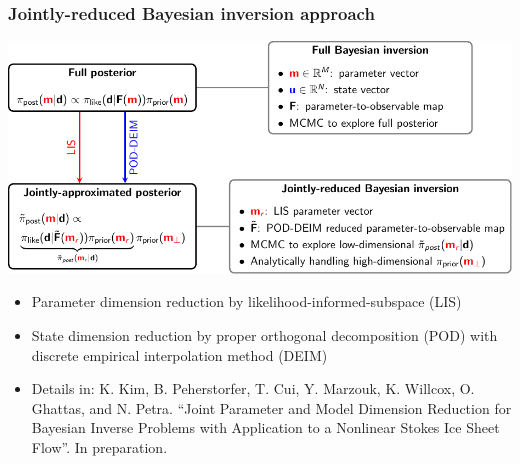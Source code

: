 \documentclass{beamer}
\begin{document}
\begin{frame}
  \frametitle{Jointly-reduced Bayesian inversion approach}
  \begin{center}
    \includegraphics[width=\columnwidth]{tikz/summary_reduced_bayes.pdf}
  \end{center}

  \begin{itemize}
    \item Parameter dimension reduction by likelihood-informed-subspace (LIS)
    \item State dimension reduction by proper orthogonal decomposition (POD) with
      discrete empirical interpolation method (DEIM)
  \end{itemize}

  \vspace{0.3cm}

  \tiny
  \begin{itemize}
    \item [] Details in: K. Kim, B. Peherstorfer, T. Cui, Y. Marzouk, K.
      Willcox, O. Ghattas, and N. Petra. “Joint Parameter and Model Dimension
      Reduction for Bayesian Inverse Problems with Application to a Nonlinear
      Stokes Ice Sheet Flow”. In preparation.
  \end{itemize}
\end{frame}
\end{document}
